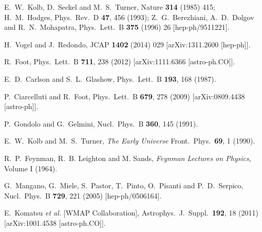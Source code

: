 \documentclass[12pt]{article}
\begin{document}
{{\begin{thebibliography}{999}
  E.~W.~Kolb, D.~Seckel and M.~S.~Turner,
  Nature {\bf 314} (1985) 415;
H.~M.~Hodges,
Phys.\ Rev.\ D {\bf 47}, 456 (1993);
 Z.~G.~Berezhiani, A.~D.~Dolgov and R.~N.~Mohapatra,
  Phys.\ Lett.\ B {\bf 375} (1996) 26
  [hep-ph/9511221].
  
  H.~Vogel and J.~Redondo,
  JCAP {\bf 1402} (2014) 029
  [arXiv:1311.2600 [hep-ph]].
  
  R.~Foot,
  Phys.\ Lett.\ B {\bf 711}, 238 (2012)
  [arXiv:1111.6366 [astro-ph.CO]].
  
 E.~D.~Carlson and S.~L.~Glashow,
 Phys.\ Lett.\ B {\bf 193}, 168 (1987).
  
  P.~Ciarcelluti and R.~Foot,
  Phys.\ Lett.\ B {\bf 679}, 278 (2009)
  [arXiv:0809.4438 [astro-ph]].
  
  P.~Gondolo and G.~Gelmini,
  Nucl.\ Phys.\ B {\bf 360}, 145 (1991).

  E.~W.~Kolb and M.~S.~Turner,
  {\it The Early Universe}
  Front.\ Phys.\  {\bf 69}, 1 (1990).
  
  R.~P.~Feynman, R.~B. Leighton and M. Sands, {\it Feynman Lectures on Physics}, Volume I (1964). 
 
  G.~Mangano, G.~Miele, S.~Pastor, T.~Pinto, O.~Pisanti and P.~D.~Serpico,
  Nucl.\ Phys.\ B {\bf 729}, 221 (2005)
  [hep-ph/0506164].
  
  E.~Komatsu {\it et al.}  [WMAP Collaboration],
  Astrophys.\ J.\ Suppl.\  {\bf 192}, 18 (2011)
  [arXiv:1001.4538 [astro-ph.CO]].
  

\end{thebibliography}}}
\end{document}
